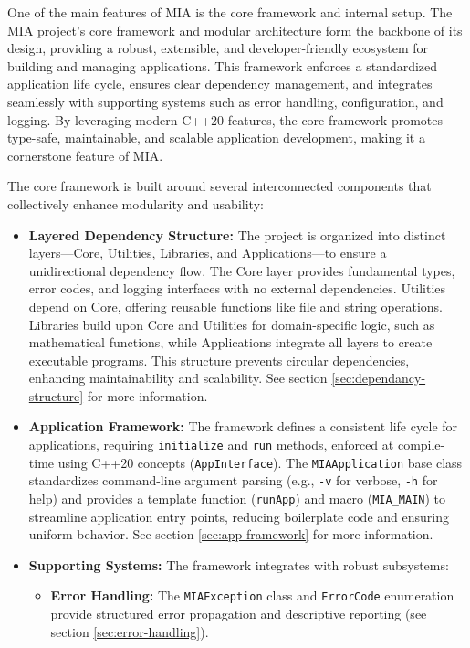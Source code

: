 One of the main features of MIA is the core framework and internal setup. The MIA project's core framework and modular architecture form the backbone of its design, providing a robust, extensible, and developer-friendly ecosystem for building and managing applications. This framework enforces a standardized application life cycle, ensures clear dependency management, and integrates seamlessly with supporting systems such as error handling, configuration, and logging. By leveraging modern C++20 features, the core framework promotes type-safe, maintainable, and scalable application development, making it a cornerstone feature of MIA.

The core framework is built around several interconnected components that collectively enhance modularity and usability:
\begin{itemize}
	\item \textbf{Layered Dependency Structure:} The project is organized into distinct layers---Core, Utilities, Libraries, and Applications---to ensure a unidirectional dependency flow. The Core layer provides fundamental types, error codes, and logging interfaces with no external dependencies. Utilities depend on Core, offering reusable functions like file and string operations. Libraries build upon Core and Utilities for domain-specific logic, such as mathematical functions, while Applications integrate all layers to create executable programs. This structure prevents circular dependencies, enhancing maintainability and scalability. See section \ref{sec:dependancy-structure} for more information.
	\item \textbf{Application Framework:} The framework defines a consistent life cycle for applications, requiring \texttt{initialize} and \texttt{run} methods, enforced at compile-time using C++20 concepts (\texttt{AppInterface}). The \texttt{MIAApplication} base class standardizes command-line argument parsing (e.g., \texttt{-v} for verbose, \texttt{-h} for help) and provides a template function (\texttt{runApp}) and macro (\texttt{MIA\_MAIN}) to streamline application entry points, reducing boilerplate code and ensuring uniform behavior. See section \ref{sec:app-framework} for more information.
	\item \textbf{Supporting Systems:} The framework integrates with robust subsystems:
	\begin{itemize}
		\item \textbf{Error Handling:} The \texttt{MIAException} class and \texttt{ErrorCode} enumeration provide structured error propagation and descriptive reporting (see section \ref{sec:error-handling}).

\end{itemize}
\end{itemize}
